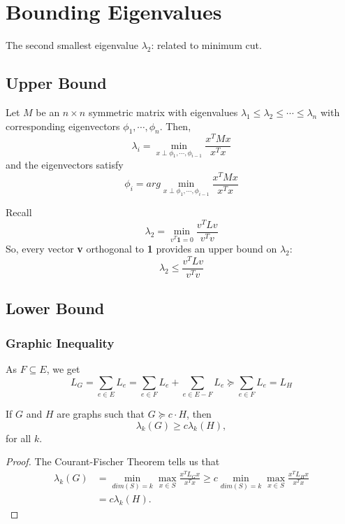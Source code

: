 \section{Bounding Eigenvalues}
The second smallest eigenvalue $\lambda_2$: related to minimum cut.
\subsection{Upper Bound}
\begin{theorem} Let $M$ be an $n\times n$ symmetric matrix with eigenvalues $\lambda_1 \leq \lambda_2 \leq \cdots \leq \lambda_n$ with corresponding eigenvectors $\phi_1, \cdots, \phi_n$. Then,
\begin{equation}
    \lambda_i = \min_{x \perp \phi_1,\cdots,\phi_{i-1}} \frac{x^{T}Mx}{x^{T}x}
\end{equation}
and the eigenvectors satisfy
\begin{equation}
    \phi_i = arg\min_{x \perp \phi_1,\cdots,\phi_{i-1}} \frac{x^{T}Mx}{x^{T}x}
\end{equation}
\end{theorem}
Recall
\begin{equation}
    \lambda_2 = \min_{v^T\textbf{1}=0}\frac{v^{T}Lv}{v^{T}v}
\end{equation}
So, every vector \textbf{v} orthogonal to \textbf{1} provides an upper bound on $\lambda_2$:
\begin{equation}
    \lambda_2 \leq \frac{v^{T}Lv}{v^{T}v}
\end{equation}

\subsection{Lower Bound}
\subsubsection{Graphic Inequality}
As $F \subseteq E$, we get
\begin{equation}
    L_G = \sum_{e \in E}L_e = \sum_{e \in F}L_e+\sum_{e \in E-F}L_e
    \succeq  \sum_{e \in F}L_e = L_H
\end{equation}

\begin{lemma}
If $G$ and $H$ are graphs such that $G \succeq c \cdot H$, then
\begin{equation}
    \lambda_{k}(G) \geq c\lambda_{k}(H),
\end{equation}
for all $k$.
\end{lemma}
\begin{proof}
The Courant-Fischer Theorem tells us that
\begin{equation}
\begin{aligned}
    \lambda_{k}(G)&=\min\limits_{dim(S)=k}\max\limits_{x\in S}\frac{x^{T}L_{G}x}{x^{T}x} \geq c \min\limits_{dim(S)=k} \max\limits_{x\in S}\frac{x^{T}L_{H}x}{x^{T}x}\\
    &=c\lambda_{k}(H).
\end{aligned}
\end{equation}
\end{proof}